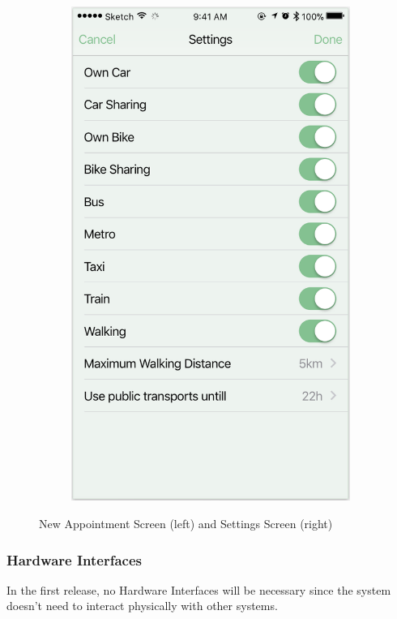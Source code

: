 \documentclass[12pt]{article}
\begin{document}
\begin{figure}[H]
\begin{subfigure}{.4\textwidth}
        \includegraphics[scale=0.455]{interfaceSettings.png}
        \label{fig:settingsScreen}
    \end{subfigure}
    \caption{New Appointment Screen (left) and Settings Screen (right)}
\end{figure}


\subsubsection{Hardware Interfaces}
In the first release, no Hardware Interfaces will be necessary since the system doesn't need to interact physically with other systems.
\end{document}

